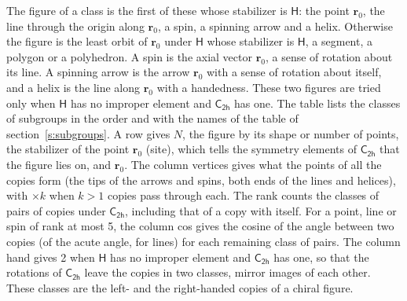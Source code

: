 \documentclass[10pt,a4paper]{article}
\numberwithin{equation}{section}
\newcommand{\grp}[1]{\mathsf{#1}}
\newcommand{\pointr}{\mathbf{r}}
\begin{document}
\leavevmode\label{n:head.figure}The figure of a class is the first of these whose stabilizer is $\grp{H}$: the point $\pointr_0$, the line through the origin along $\pointr_0$, a spin, a spinning arrow and a helix. Otherwise the figure is the least orbit of $\pointr_0$ under $\grp{H}$ whose stabilizer is $\grp{H}$, a segment, a polygon or a polyhedron. A spin is the axial vector $\pointr_0$, a sense of rotation about its line. A spinning arrow is the arrow $\pointr_0$ with a sense of rotation about itself, and a helix is the line along $\pointr_0$ with a handedness. These two figures are tried only when $\grp{H}$ has no improper element and $\grp{C_{2h}}$ has one. The table lists the classes of subgroups in the order and with the names of the table of section~\ref{s:subgroups}. \label{n:head.site}A row gives $N$, the figure by its shape or number of points, the stabilizer of the point $\pointr_0$ (site), which tells the symmetry elements of $\grp{C_{2h}}$ that the figure lies on, and $\pointr_0$. \label{n:head.vertices}The column vertices gives what the points of all the copies form (the tips of the arrows and spins, both ends of the lines and helices), with ${\times}k$ when $k > 1$ copies pass through each. \label{n:head.rank}The rank counts the classes of pairs of copies under $\grp{C_{2h}}$, including that of a copy with itself. \label{n:head.cos}For a point, line or spin of rank at most 5, the column cos gives the cosine of the angle between two copies (of the acute angle, for lines) for each remaining class of pairs. \label{n:head.hand}The column hand gives 2 when $\grp{H}$ has no improper element and $\grp{C_{2h}}$ has one, so that the rotations of $\grp{C_{2h}}$ leave the copies in two classes, mirror images of each other. These classes are the left- and the right-handed copies of a chiral figure.
\end{document}
